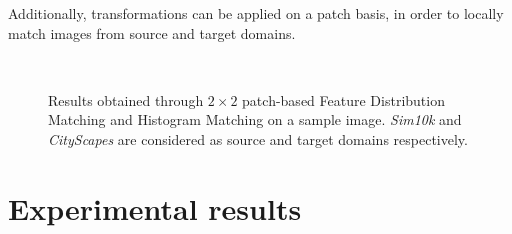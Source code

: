 \documentclass[%
    corpo=12pt,
    twoside,
    stile=classica,   
    tipotesi=magistrale,
    evenboxes,
    english,
	numerazioneromana,
]{toptesi}
\begin{document}
Additionally, transformations can be applied on a patch basis, in order to locally match images from source and target domains.

\begin{figure}[ht]
	\centering
	\\
	\caption{Results obtained through $2\times 2$ patch-based Feature Distribution Matching and Histogram Matching on a sample image. \textit{Sim10k} and \textit{CityScapes} are considered as source and target domains respectively.}
	\label{fig:patchkis}
\end{figure}

\chapter{Experimental results}
\end{document}
